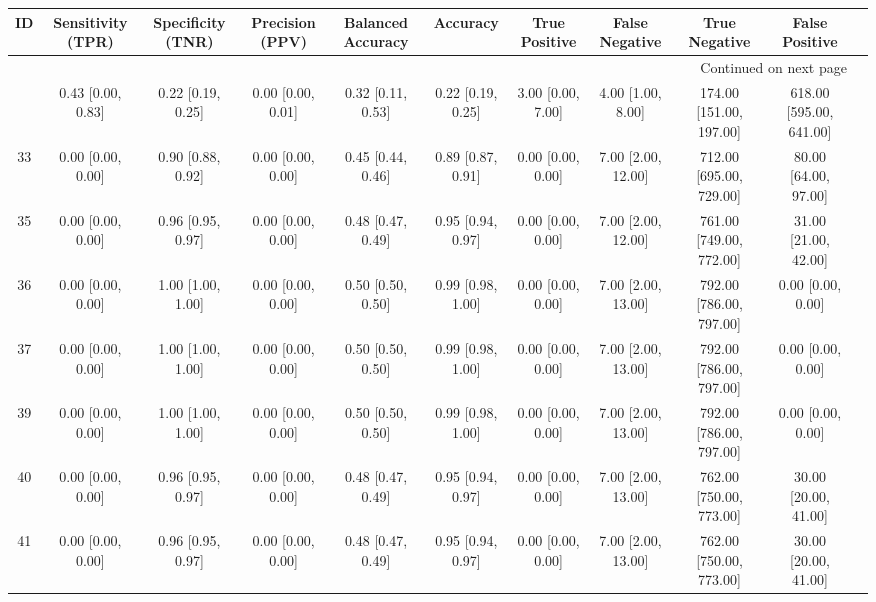 \documentclass[8pt]{article}
\begin{document}
\begin{center}
\begin{footnotesize}
\begin{longtable}{|ccccccccccc|}
\toprule
 ID &  Sensitivity (TPR) &  Specificity (TNR) &    Precision (PPV) &  Balanced Accuracy &           Accuracy &      True Positive &      False Negative &            True Negative &           False Positive \\
\midrule
\endhead
\midrule
\multicolumn{10}{r}{{Continued on next page}} \\
\midrule
\endfoot

\bottomrule
\endlastfoot
 38 &  0.43 [0.00, 0.83] &  0.22 [0.19, 0.25] &  0.00 [0.00, 0.01] &  0.32 [0.11, 0.53] &  0.22 [0.19, 0.25] &  3.00 [0.00, 7.00] &   4.00 [1.00, 8.00] &  174.00 [151.00, 197.00] &  618.00 [595.00, 641.00] \\
 33 &  0.00 [0.00, 0.00] &  0.90 [0.88, 0.92] &  0.00 [0.00, 0.00] &  0.45 [0.44, 0.46] &  0.89 [0.87, 0.91] &  0.00 [0.00, 0.00] &  7.00 [2.00, 12.00] &  712.00 [695.00, 729.00] &     80.00 [64.00, 97.00] \\
 35 &  0.00 [0.00, 0.00] &  0.96 [0.95, 0.97] &  0.00 [0.00, 0.00] &  0.48 [0.47, 0.49] &  0.95 [0.94, 0.97] &  0.00 [0.00, 0.00] &  7.00 [2.00, 12.00] &  761.00 [749.00, 772.00] &     31.00 [21.00, 42.00] \\
 36 &  0.00 [0.00, 0.00] &  1.00 [1.00, 1.00] &  0.00 [0.00, 0.00] &  0.50 [0.50, 0.50] &  0.99 [0.98, 1.00] &  0.00 [0.00, 0.00] &  7.00 [2.00, 13.00] &  792.00 [786.00, 797.00] &        0.00 [0.00, 0.00] \\
 37 &  0.00 [0.00, 0.00] &  1.00 [1.00, 1.00] &  0.00 [0.00, 0.00] &  0.50 [0.50, 0.50] &  0.99 [0.98, 1.00] &  0.00 [0.00, 0.00] &  7.00 [2.00, 13.00] &  792.00 [786.00, 797.00] &        0.00 [0.00, 0.00] \\
 39 &  0.00 [0.00, 0.00] &  1.00 [1.00, 1.00] &  0.00 [0.00, 0.00] &  0.50 [0.50, 0.50] &  0.99 [0.98, 1.00] &  0.00 [0.00, 0.00] &  7.00 [2.00, 13.00] &  792.00 [786.00, 797.00] &        0.00 [0.00, 0.00] \\
 40 &  0.00 [0.00, 0.00] &  0.96 [0.95, 0.97] &  0.00 [0.00, 0.00] &  0.48 [0.47, 0.49] &  0.95 [0.94, 0.97] &  0.00 [0.00, 0.00] &  7.00 [2.00, 13.00] &  762.00 [750.00, 773.00] &     30.00 [20.00, 41.00] \\
 41 &  0.00 [0.00, 0.00] &  0.96 [0.95, 0.97] &  0.00 [0.00, 0.00] &  0.48 [0.47, 0.49] &  0.95 [0.94, 0.97] &  0.00 [0.00, 0.00] &  7.00 [2.00, 13.00] &  762.00 [750.00, 773.00] &     30.00 [20.00, 41.00] \\

\end{longtable}
\end{footnotesize}
\end{center}
\end{document}
